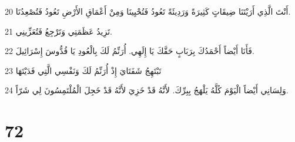 \par 20 أَنْتَ الَّذِي أَرَيْتَنَا ضِيقَاتٍ كَثِيرَةً وَرَدِيئَةً تَعُودُ فَتُحْيِينَا وَمِنْ أَعْمَاقِ الأَرْضِ تَعُودُ فَتُصْعِدُنَا.
\par 21 تَزِيدُ عَظَمَتِي وَتَرْجِعُ فَتُعَزِّينِي.
\par 22 فَأَنَا أَيْضاً أَحْمَدُكَ بِرَبَابٍ حَقَّكَ يَا إِلَهِي. أُرَنِّمُ لَكَ بِالْعُودِ يَا قُدُّوسَ إِسْرَائِيلَ.
\par 23 تَبْتَهِجُ شَفَتَايَ إِذْ أُرَنِّمُ لَكَ وَنَفْسِي الَّتِي فَدَيْتَهَا
\par 24 وَلِسَانِي أَيْضاً الْيَوْمَ كُلَّهُ يَلْهَجُ بِبِرِّكَ. لأَنَّهُ قَدْ خَزِيَ لأَنَّهُ قَدْ خَجِلَ الْمُلْتَمِسُونَ لِي شَرّاً.

\chapter{72}

